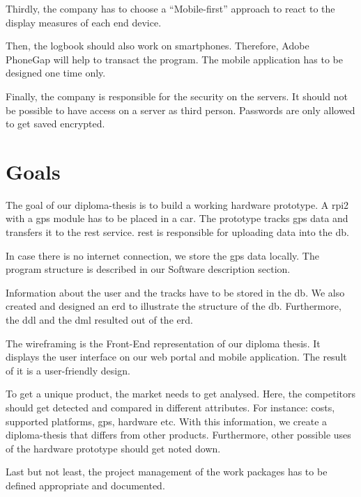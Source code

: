 Thirdly, the company has to choose a “Mobile-first” approach to react to the display measures of each end device.

Then, the logbook should also work on smartphones. Therefore, Adobe PhoneGap will help to transact the program. The mobile application has to be designed one time only.

Finally, the company is responsible for the security on the servers. It should not be possible to have access on a server as third person. Passwords are only allowed to get saved encrypted.
\clearpageauthor
\newpage
\section*{Goals}
The goal of our diploma-thesis is to build a working hardware prototype. A \gls{rpi2} with a \gls{gps} module has to be placed in a car. The prototype tracks \gls{gps} data and transfers it to the \gls{rest} service. \gls{rest} is responsible for uploading data into the \gls{db}. 

In case there is no internet connection, we store the \gls{gps} data locally. The program structure is described in our Software description section.

Information about the user and the tracks have to be stored in the \gls{db}. We also created and designed an \gls{erd} to illustrate the structure of the \gls{db}. Furthermore, the \gls{ddl} and the \gls{dml} resulted out of the \gls{erd}.

The wireframing is the Front-End representation of our diploma thesis. It displays the user interface on our web portal and mobile application. The result of it is a user-friendly design.

To get a unique product, the market needs to get analysed. Here, the competitors should get detected and compared in different attributes. For instance: costs, supported platforms, \gls{gps}, hardware etc. With this information, we create a diploma-thesis that differs from other products. Furthermore, other possible uses of the hardware prototype should get noted down.

Last but not least, the project management of the work packages has to be defined appropriate and documented.
\clearpageauthor

